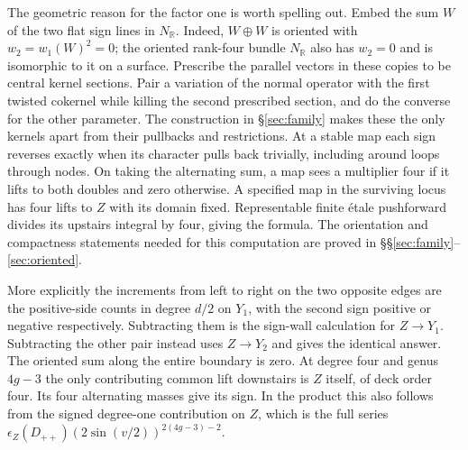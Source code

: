 The geometric reason for the factor one is worth spelling out. Embed
the sum $W$ of the two flat sign lines in $N_{\mathbb R}$. Indeed,
$W\oplus W$ is oriented with $w_2=w_1(W)^2=0$; the oriented rank-four
bundle $N_{\mathbb R}$ also has $w_2=0$ and is isomorphic to it on
a surface. Prescribe the parallel vectors in these copies to be
central kernel sections. Pair a variation of the normal operator with
the first twisted cokernel while killing the second prescribed
section, and do the converse for the other parameter. The construction
in \S\ref{sec:family} makes these the only kernels apart from their
pullbacks and restrictions. At a stable map each sign reverses exactly
when its character pulls back trivially, including around loops through
nodes. On taking the alternating sum, a map sees a multiplier four
if it lifts to both doubles and zero otherwise. A specified map in
the surviving locus has four lifts to $Z$ with its domain fixed.
Representable finite \'etale pushforward divides its upstairs integral
by four, giving the formula. The orientation and compactness statements
needed for this computation are proved in
\S\S\ref{sec:family}--\ref{sec:oriented}.

More explicitly the increments from left to right on the two opposite
edges are the positive-side counts in degree $d/2$ on $Y_1$, with the
second sign positive or negative respectively. Subtracting them is
the sign-wall calculation for $Z\to Y_1$. Subtracting the other pair
instead uses $Z\to Y_2$ and gives the identical answer. The oriented
sum along the entire boundary is zero. At degree four and genus
$4g-3$ the only contributing common lift downstairs is $Z$ itself,
of deck order four. Its four alternating masses give its sign.
In the product this also follows from the signed degree-one contribution
on $Z$, which is the full series
$\epsilon_Z(D_{++})(2\sin(v/2))^{2(4g-3)-2}$.
